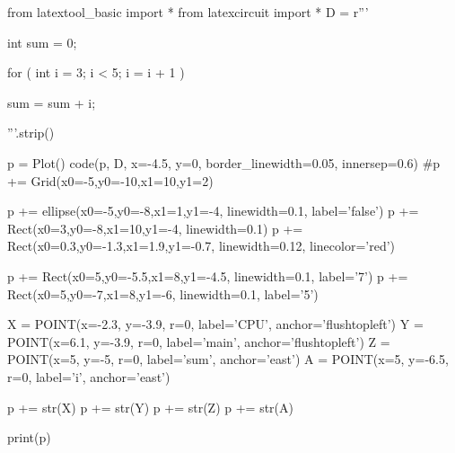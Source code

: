 \begin{python}
from latextool_basic import *
from latexcircuit import *
D = r'''



int sum = 0;

    for ( int i = 3;     i < 5;     i = i + 1 )


        sum = sum + i;



'''.strip()

p = Plot()
code(p, D, x=-4.5, y=0, border_linewidth=0.05, innersep=0.6)
#p += Grid(x0=-5,y0=-10,x1=10,y1=2)

p += ellipse(x0=-5,y0=-8,x1=1,y1=-4, linewidth=0.1, label='false')
p += Rect(x0=3,y0=-8,x1=10,y1=-4, linewidth=0.1)
p += Rect(x0=0.3,y0=-1.3,x1=1.9,y1=-0.7, linewidth=0.12, linecolor='red')

p += Rect(x0=5,y0=-5.5,x1=8,y1=-4.5, linewidth=0.1, label='7')
p += Rect(x0=5,y0=-7,x1=8,y1=-6, linewidth=0.1, label='5')

X = POINT(x=-2.3, y=-3.9, r=0, label='CPU', anchor='flushtopleft')
Y = POINT(x=6.1, y=-3.9, r=0, label='main', anchor='flushtopleft')
Z = POINT(x=5, y=-5, r=0, label='sum', anchor='east')
A = POINT(x=5, y=-6.5, r=0, label='i', anchor='east')

p += str(X)
p += str(Y)
p += str(Z)
p += str(A)

print(p)
\end{python}

